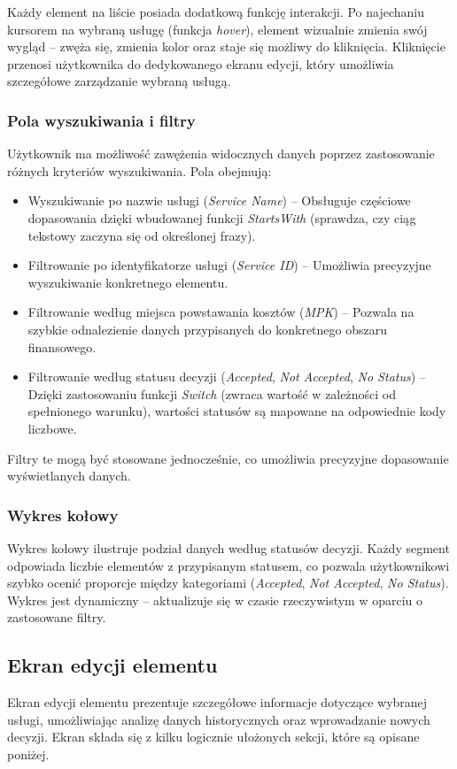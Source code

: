 Każdy element na liście posiada dodatkową funkcję interakcji. Po najechaniu kursorem na wybraną usługę (funkcja \textit{hover}), element wizualnie zmienia swój wygląd -- zwęża się, zmienia kolor oraz staje się możliwy do kliknięcia. Kliknięcie przenosi użytkownika do dedykowanego ekranu edycji, który umożliwia szczegółowe zarządzanie wybraną usługą.

\subsubsection*{Pola wyszukiwania i filtry}
Użytkownik ma możliwość zawężenia widocznych danych poprzez zastosowanie różnych kryteriów wyszukiwania. Pola obejmują:
\begin{itemize}
    \item {Wyszukiwanie po nazwie usługi (\textit{Service Name})} -- Obsługuje częściowe dopasowania dzięki wbudowanej funkcji \textit{StartsWith} (sprawdza, czy ciąg tekstowy zaczyna się od określonej frazy).
    \item {Filtrowanie po identyfikatorze usługi (\textit{Service ID})} -- Umożliwia precyzyjne wyszukiwanie konkretnego elementu.
    \item {Filtrowanie według miejsca powstawania kosztów (\textit{MPK})} -- Pozwala na szybkie odnalezienie danych przypisanych do konkretnego obszaru finansowego.
    \item {Filtrowanie według statusu decyzji (\textit{Accepted}, \textit{Not Accepted}, \textit{No Status})} -- Dzięki zastosowaniu funkcji \textit{Switch} (zwraca wartość w zależności od spełnionego warunku), wartości statusów są mapowane na odpowiednie kody liczbowe.
\end{itemize}
Filtry te mogą być stosowane jednocześnie, co umożliwia precyzyjne dopasowanie wyświetlanych danych.

\subsubsection*{Wykres kołowy}
Wykres kołowy ilustruje podział danych według statusów decyzji. Każdy segment odpowiada liczbie elementów z przypisanym statusem, co pozwala użytkownikowi szybko ocenić proporcje między kategoriami (\textit{Accepted}, \textit{Not Accepted}, \textit{No Status}). Wykres jest dynamiczny -- aktualizuje się w czasie rzeczywistym w oparciu o zastosowane filtry.



\subsection{Ekran edycji elementu}
Ekran edycji elementu prezentuje szczegółowe informacje dotyczące wybranej usługi, umożliwiając analizę danych historycznych oraz wprowadzanie nowych decyzji. Ekran składa się z kilku logicznie ułożonych sekcji, które są opisane poniżej.

